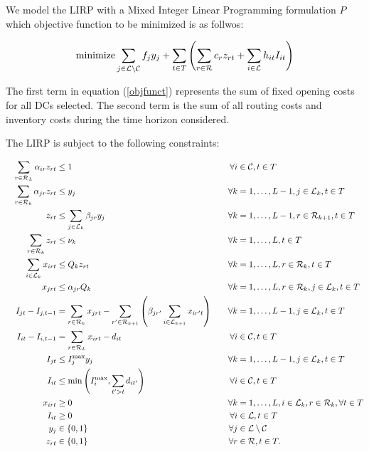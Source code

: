 \documentclass[a4paper,10pt]{article}
\begin{document}
\begin{linenumbers}
We model the LIRP with a Mixed Integer Linear Programming formulation $P$ which objective function to be minimized is as follwos: 
 
\begin{equation} \label{objfunct}
    \text{minimize} \sum_{j\in \mathcal{L} \setminus \mathcal{C}} f_{j} y_{j} +\sum_{t\in T} \left( \sum_{r\in \mathcal{R}} c_r z_{rt} + \sum_{i\in \mathcal{L}} h_{it} I_{it}\right)
    \end{equation} 
    
    The first term in equation (\ref{objfunct}) represents the sum of fixed opening costs for all DCs selected. 
    The second term is the sum of all routing costs and inventory costs during the time horizon considered. 
    
  The LIRP is subject to the following constraints:
    
    \begin{alignat}{3}
&&\sum_{r\in \mathcal{R}_L} \alpha_{ir} z_{rt} &\leq 1 						&\forall i&\in \mathcal{C}, t \in T  					\label{const:singleroutecustomers}\\
&&\sum_{r\in \mathcal{R}_k} \alpha_{jr} z_{rt} &\leq y_j 					&\forall k&=1,\ldots,L-1, j\in \mathcal{L}_k, t \in T  \label{const:singleroutedc}\\
&&z_{rt} 					&\leq \sum_{j\in\mathcal{L}_{k}}\beta_{jr}y_j 	&\forall k&=1,\ldots,L-1,r\in \mathcal{R}_{k+1}, t \in T \label{const:startfromopendepots}\\
&&\sum_{r\in \mathcal{R}_k} z_{rt} &\leq 	\nu_k							&\forall k&=1,\ldots,L, t \in T  				\label{const:fleetcapa}\\
&&\sum_{i\in \mathcal{L}_k} x_{irt}   		&\leq Q_k z_{rt} 			&\forall k&=1,\ldots,L,  r\in \mathcal{R}_k, t \in T 	\label{const:deliveryUB}\\
&&x_{jrt}   		&\leq \alpha_{jr} Q_k  						&\forall k&=1,\ldots,L,  r\in \mathcal{R}_k, j \in \mathcal{L}_k, t \in T	\label{const:deliveryConstLoc}\\
&&I_{jt} - I_{j,t-1} &= \sum_{r\in\mathcal{R}_k} x_{jrt} 	- \sum_{r'\in \mathcal{R}_{k+1}}\left(\beta_{jr'} \sum_{i\in \mathcal{L}_{k+1}}x_{ir't}\right)\quad 						&\forall k&=1,\ldots,L-1, j\in \mathcal{L}_k, t \in T 				\label{const:invflowdepots}\\
&&I_{it} - I_{i,t-1} &= \sum_{r\in \mathcal{R}_L} x_{irt} - d_{it} 			&\forall i&\in \mathcal{C},  t \in T					\label{const:invflowcustomers}\\
&&I_{jt}	&\leq I_j^{\max} y_j  									&\forall k&=1,\ldots,L-1,  j\in \mathcal{L}_k, t \in T \label{const:invdepotUB}\\	
&&I_{it} 	&\leq \min\left(I_i^{\max}, \sum_{t' > t}d_{it'}\right)	&\forall i&\in \mathcal{C},  t \in T					\label{const:invcustUB}\\
&&x_{irt}			&\geq 0 										&\forall k&=1,\ldots,L,  i\in \mathcal{L}_k,  r\in \mathcal{R}_k,\forall t \in T	\label{const:upos}	\\
&&I_{it}			&\geq 0 										&\forall i &\in \mathcal{L},  t \in T					\label{const:invCpos}	\\
&&y_{j}				& \in \{0,1\} 								&\forall j&\in \mathcal{L}\setminus\mathcal{C}						\label{const:ybool}\\	
&&z_{rt}			&\in \{0,1\} 									&\forall r&\in \mathcal{R},  t \in T.					\label{const:zbool}
\end{alignat}



\end{linenumbers}
\end{document}
